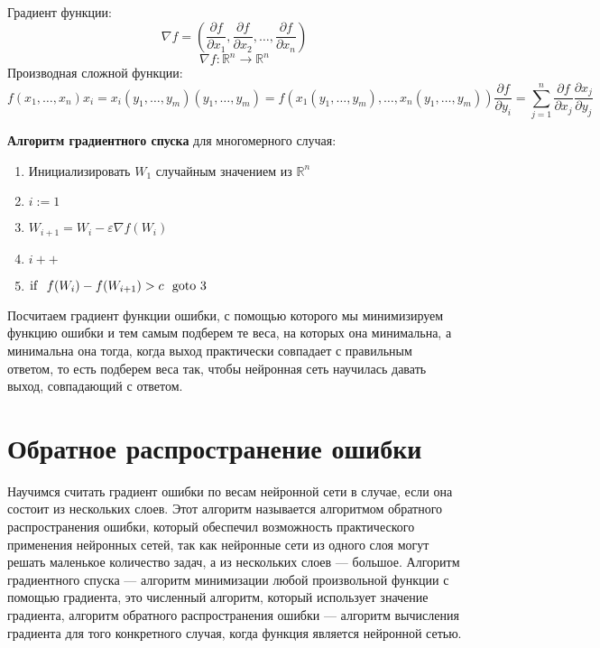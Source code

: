 \documentclass[14pt]{extreport}
\begin{document}
        Градиент функции: $$\nabla f = \left(\frac{\partial f}{\partial x_1}, \frac{\partial f}{\partial x_2}, \ldots, \frac{\partial f}{\partial x_n}\right)$$
        $$\nabla f:\mathbb{R}^n\rightarrow \mathbb{R}^n$$
        Производная сложной функции: 
            \[f(x_1, \ldots, x_n)
            x_i = x_i(y_1, \ldots, y_m)
            (y_1, \ldots, y_m) = f(x_1(y_1, \ldots, y_m), \ldots, x_n(y_1, \ldots, y_m))
            \frac{\partial f}{\partial y_i} = \sum_{j=1}^{n} \frac{\partial f}{\partial x_j}\frac{\partial x_j}{\partial y_j}\]

        \textbf{
            Алгоритм градиентного спуска
        } для многомерного случая:
        \begin{enumerate}
             \item Инициализировать $W_1$ случайным значением из $\mathbb{R}^n$
             \item $i:=1$
             \item $W_{i+1}=W_i-\varepsilon \nabla f(W_i)$
             \item $i++$
             \item ${\rm if}\ \ f(W_{i})-f(W_{i+1})>c\ \ {\rm goto}\ 3$
        \end{enumerate}

        Посчитаем градиент функции ошибки, с помощью которого мы минимизируем функцию ошибки и тем самым подберем те веса, на которых она минимальна, а минимальна она тогда, когда выход практически совпадает с правильным ответом, то есть подберем веса так, чтобы нейронная сеть научилась давать выход, совпадающий с ответом.

        \section{Обратное распространение ошибки}

        Научимся считать градиент ошибки по весам нейронной сети в случае, если она состоит из нескольких слоев. Этот алгоритм называется алгоритмом обратного распространения ошибки, который обеспечил возможность практического применения нейронных сетей, так как нейронные сети из одного слоя могут решать маленькое количество задач, а из нескольких слоев --- большое. Алгоритм градиентного спуска --- алгоритм минимизации любой произвольной функции с помощью градиента, это численный алгоритм, который использует значение градиента, алгоритм обратного распространения ошибки --- алгоритм вычисления градиента для того конкретного случая, когда функция является нейронной сетью.
\end{document}
